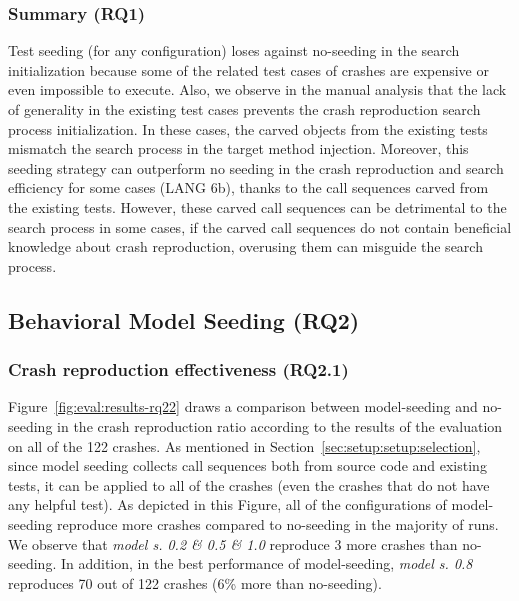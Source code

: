 \subsubsection{Summary (\textbf{RQ1)}}

Test seeding (for any configuration) loses against no-seeding in the search initialization because some of the related test cases of crashes are expensive or even impossible to execute.
Also, we observe in the manual analysis that the lack of generality in the existing test cases prevents the crash reproduction search process initialization. In these cases, the carved objects from the existing tests mismatch the search process in the target method injection.
Moreover, this seeding strategy can outperform no seeding in the crash reproduction and search efficiency for some cases (\eg LANG 6b), thanks to the call sequences carved from the existing tests. However, these carved call sequences can be detrimental to the search process in some cases, if the carved call sequences do not contain beneficial knowledge about crash reproduction, overusing them can misguide the search process.


\subsection{Behavioral Model Seeding (RQ2)}



\subsubsection{Crash reproduction effectiveness (\textbf{RQ2.1})}

Figure~\ref{fig:eval:results-rq22} draws a comparison between model-seeding and no-seeding in the crash reproduction ratio according to the results of the evaluation on all of the 122 crashes. As mentioned in Section~\ref{sec:setup:setup:selection}, since model seeding collects call sequences both from source code and existing tests, it can be applied to all of the crashes (even the crashes that do not have any helpful test). As depicted in this Figure, all of the configurations of model-seeding reproduce more crashes compared to no-seeding in the majority of runs. We observe that \textit{model s. 0.2 \& 0.5 \& 1.0} reproduce 3 more crashes than no-seeding. In addition, in the best performance of model-seeding, \textit{model s. 0.8} reproduces 70 out of 122 crashes (6\% more than no-seeding).


